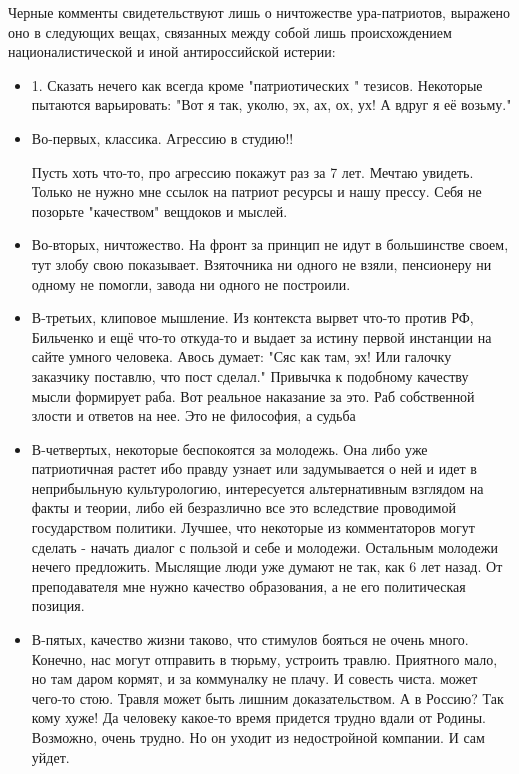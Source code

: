 \begin{itemize}
Черные комменты свидетельствуют лишь о ничтожестве ура-патриотов, выражено оно
в следующих вещах, связанных между собой лишь происхождением националистической
и иной антироссийской истерии: 

\begin{itemize}
\item 1. Сказать нечего как всегда кроме
"патриотических " тезисов. Некоторые пытаются варьировать: "Вот я так, уколю,
эх, ах, ох, ух! А вдруг я её возьму." 

\item Во-первых, классика. Агрессию в студию!!

Пусть хоть что-то, про агрессию покажут раз за 7 лет. Мечтаю увидеть. Только не
нужно мне ссылок на патриот ресурсы и нашу прессу. Себя не позорьте "качеством"
вещдоков и мыслей. 

\item Во-вторых, ничтожество. На фронт за принцип не идут в
большинстве своем, тут злобу свою показывает. Взяточника ни одного не взяли,
пенсионеру ни одному не помогли, завода ни одного не построили. 

\item В-третьих,
клиповое мышление. Из контекста вырвет что-то против РФ, Бильченко и ещё что-то
откуда-то и выдает за истину первой инстанции на сайте умного человека. Авось
думает: "Сяс как там, эх! Или галочку заказчику поставлю, что пост сделал."
Привычка к подобному качеству мысли формирует раба. Вот реальное наказание за
это. Раб собственной злости и ответов на нее. Это не философия, а судьба

\item В-четвертых, некоторые беспокоятся за молодежь. Она либо уже патриотичная
растет ибо правду узнает или задумывается о ней и идет в неприбыльную
культурологию, интересуется альтернативным взглядом на факты и теории, либо ей
безразлично все это вследствие проводимой государством политики. Лучшее, что
некоторые из комментаторов могут сделать - начать диалог с пользой и себе и
молодежи. Остальным молодежи нечего предложить. Мыслящие люди уже думают не
так, как 6 лет назад. От преподавателя мне нужно качество образования, а не его
политическая позиция. 

\item В-пятых, качество жизни таково, что стимулов бояться не
очень много. Конечно, нас могут отправить в тюрьму, устроить травлю. Приятного
мало, но там даром кормят, и за коммуналку не плачу. И совесть чиста. может
чего-то стою. Травля может быть лишним доказательством. А в Россию? Так кому
хуже! Да человеку какое-то время придется трудно вдали от Родины. Возможно,
очень трудно. Но он уходит из недостройной компании. И сам уйдет. 


\end{itemize}
\end{itemize}
